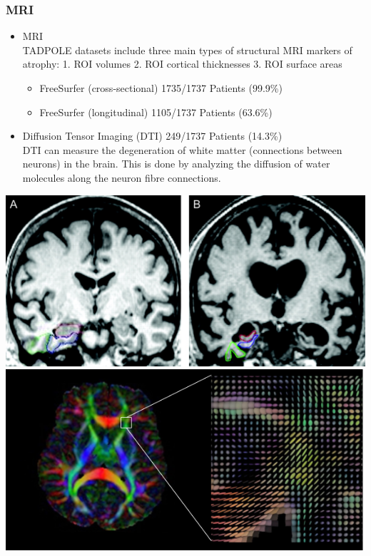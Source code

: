 \documentclass{beamer}
\begin{document}
    \begin{frame}
        \frametitle{MRI}

        \begin{itemize}
            \item MRI \\
            TADPOLE datasets include three main types of structural MRI markers of atrophy: 1. ROI volumes 2. ROI cortical thicknesses 3. ROI surface areas
                \begin{itemize}
                    \item FreeSurfer (cross-sectional) \hfill 1735/1737 Patients (99.9\%)
                    \item FreeSurfer (longitudinal) \hfill 1105/1737 Patients (63.6\%)
                \end{itemize}
            \item Diffusion Tensor Imaging (DTI) \hfill 249/1737 Patients (14.3\%)\\
            DTI can measure the degeneration of white matter (connections between neurons) in the brain. This is done by analyzing the diffusion of water molecules along the neuron fibre connections.
        \end{itemize}
        \begin{center}
            \includegraphics[height=0.22\paperheight]{images/mri_image.jpg}
            \includegraphics[height=0.22\paperheight]{images/dti.png}
        \end{center}
    \end{frame}
\end{document}
